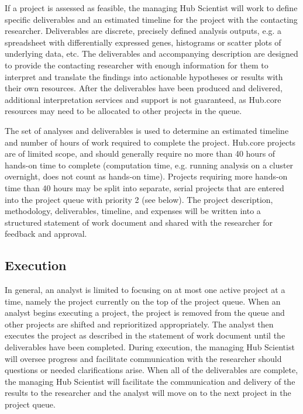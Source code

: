 \documentclass[fleqn,10pt]{wlscirep}
\begin{document}
If a project is assessed as feasible, the managing Hub Scientist will work to define specific deliverables and an estimated timeline for the project with the contacting researcher.
Deliverables are discrete, precisely defined analysis outputs, e.g. a spreadsheet with differentially expressed genes, histograms or scatter plots of underlying data, etc.
The deliverables and accompanying description are designed to provide the contacting researcher with enough information for them to interpret and translate the findings into actionable hypotheses or results with their own resources.
After the deliverables have been produced and delivered, additional interpretation services and support is not guaranteed, as Hub.core resources may need to be allocated to other projects in the queue.

The set of analyses and deliverables is used to determine an estimated timeline and number of hours of work required to complete the project.
Hub.core projects are of limited scope, and should generally require no more than 40 hours of hands-on time to complete (computation time, e.g. running analysis on a cluster overnight, does not count as hands-on time).
Projects requiring more hands-on time than 40 hours may be split into separate, serial projects that are entered into the project queue with priority 2 (see below).
The project description, methodology, deliverables, timeline, and expenses will be written into a structured statement of work document and shared with the researcher for feedback and approval.

\subsection{Execution}

In general, an analyst is limited to focusing on at most one active project at a time, namely the project currently on the top of the project queue.
When an analyst begins executing a project, the project is removed from the queue and other projects are shifted and reprioritized appropriately. 
The analyst then executes the project as described in the statement of work document until the deliverables have been completed.
During execution, the managing Hub Scientist will oversee progress and facilitate communication with the researcher should questions or needed clarifications arise.
When all of the deliverables are complete, the managing Hub Scientist will facilitate the communication and delivery of the results to the researcher and the analyst will move on to the next project in the project queue.
\end{document}
